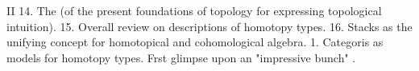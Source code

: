 II 
14.  The   
(of the present foundations of topology for expressing topological
intuition).
15. Overall review \hand{(}on\hand{)}  descriptions of homotopy types. 
16.  Stacks  as the unifying
concept for homotopical and cohomological algebra.
1. Categoris as models for homotopy types. Frst glimpse upon an
"impressive bunch" .

